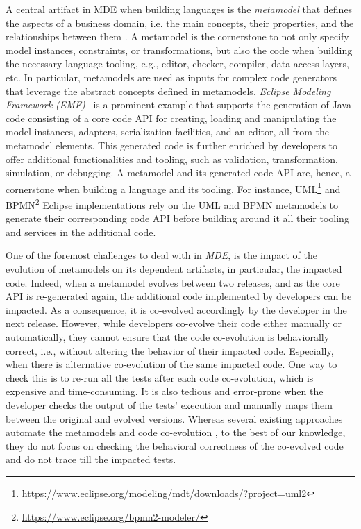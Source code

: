 A central artifact in MDE when building languages is the \emph{metamodel} that defines the aspects of a business domain, i.e. the main concepts, their properties, and the relationships between them \cite{cabot2012object}. A metamodel is the cornerstone to not only specify model instances, constraints, or transformations, but also the code when building the necessary language tooling, e.g., editor, checker, compiler, data access layers, etc. 
In particular, metamodels are used as inputs for complex code generators that leverage the abstract concepts defined in metamodels.
\emph{Eclipse Modeling Framework (EMF)}~\cite{steinberg2008emf} is a prominent example that supports the generation of Java code consisting of a core code API for creating, loading and manipulating the model instances, adapters, serialization facilities, and an editor, all from the metamodel elements.
This generated code is further enriched by developers to offer additional functionalities and tooling, such as validation, transformation, simulation, or debugging. A metamodel and its generated code API are, hence, a cornerstone when building a language and its tooling.
For instance, UML\footnote{\url{https://www.eclipse.org/modeling/mdt/downloads/?project=uml2}}  and BPMN\footnote{\url{https://www.eclipse.org/bpmn2-modeler/}} Eclipse implementations rely on the UML and BPMN metamodels to generate their corresponding code API before building around it all their tooling and services in the additional code. 

One of the foremost challenges to deal with in \emph{MDE}, is the impact of the evolution of metamodels on its dependent artifacts, in particular, the impacted code.
Indeed, when a metamodel evolves between two releases, and as the core API is re-generated again, the additional code implemented by developers can be impacted. As a consequence, it is co-evolved accordingly by the developer in the next release. 
%
However, while developers co-evolve their code either manually or automatically, they cannot ensure that the code co-evolution is behaviorally correct, i.e., without altering the behavior of their impacted code. Especially, when there is alternative co-evolution of the same impacted code. 
One way to check this is to re-run all the tests after each code co-evolution, which is expensive and time-consuming. It is also tedious and error-prone when the developer checks the output of the tests' execution and manually maps them between the original and evolved versions. 
Whereas several existing approaches automate the metamodels and code co-evolution \cite{riedl2014towards,pham2017bidirectional,jongeling2020towards,jongeling2022Structural,zaheri2021towards,yu2012maintaining,Khelladi2020,khelladi2020onthepower}, to the best of our knowledge, they do not focus on checking the behavioral correctness of the co-evolved code and do not trace till the impacted tests. 



